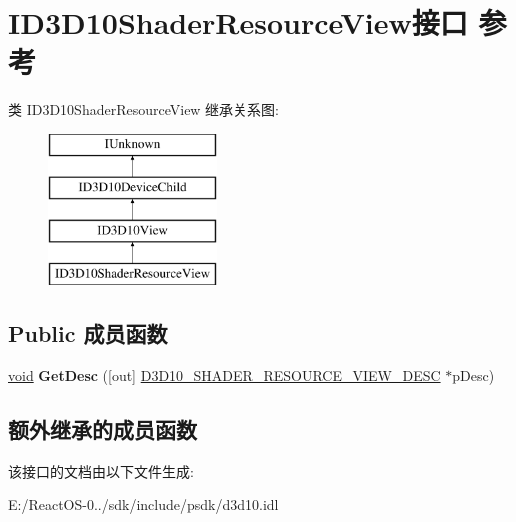 \hypertarget{interface_i_d3_d10_shader_resource_view}{}\section{I\+D3\+D10\+Shader\+Resource\+View接口 参考}
\label{interface_i_d3_d10_shader_resource_view}
类 I\+D3\+D10\+Shader\+Resource\+View 继承关系图\+:\begin{figure}[H]
\begin{center}
\leavevmode
\includegraphics[height=4.000000cm]{interface_i_d3_d10_shader_resource_view}
\end{center}
\end{figure}
\subsection*{Public 成员函数}
\begin{DoxyCompactItemize}
\item 
\mbox{\label{interface_i_d3_d10_shader_resource_view_a03ed0e99c5f885f7dc5d1937a08e202f}} 
\hyperlink{interfacevoid}{void} {\bfseries Get\+Desc} (\mbox{[}out\mbox{]} \hyperlink{struct_d3_d10___s_h_a_d_e_r___r_e_s_o_u_r_c_e___v_i_e_w___d_e_s_c}{D3\+D10\+\_\+\+S\+H\+A\+D\+E\+R\+\_\+\+R\+E\+S\+O\+U\+R\+C\+E\+\_\+\+V\+I\+E\+W\+\_\+\+D\+E\+SC} $\ast$p\+Desc)
\end{DoxyCompactItemize}
\subsection*{额外继承的成员函数}


该接口的文档由以下文件生成\+:\begin{DoxyCompactItemize}
\item 
E\+:/\+React\+O\+S-\/0../sdk/include/psdk/d3d10.\+idl\end{DoxyCompactItemize}
